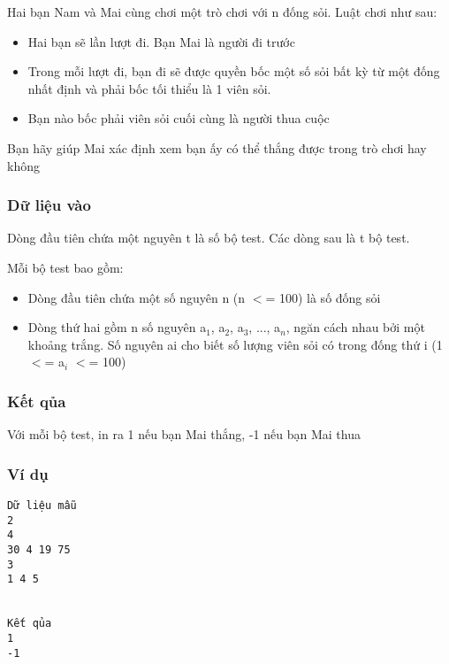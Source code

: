 

Hai bạn Nam và Mai cùng chơi một trò chơi với n đống sỏi. Luật chơi như sau:
\begin{itemize}
	\item Hai bạn sẽ lần lượt đi. Bạn Mai là người đi trước
	\item Trong mỗi lượt đi, bạn đi sẽ được quyền bốc một số sỏi bất kỳ từ một đống nhất định và phải bốc tối thiểu là 1 viên sỏi.
	\item Bạn nào bốc phải viên sỏi cuối cùng là người thua cuộc
\end{itemize}

Bạn hãy giúp Mai xác định xem bạn ấy có thể thắng được trong trò chơi hay không

\subsubsection{Dữ liệu vào}

Dòng đầu tiên chứa một nguyên t là số bộ test. Các dòng sau là t bộ test.

Mỗi bộ test bao gồm:
\begin{itemize}
	\item Dòng đầu tiên chứa một số nguyên n (n $<$= 100) là số đống sỏi
	\item Dòng thứ hai gồm n số nguyên a$_1$, a$_2$, a$_3$, ..., a$_n$, ngăn cách nhau bởi một khoảng trắng. Số nguyên ai cho biết số lượng viên sỏi có trong đống thứ i (1 $<$= a$_i $ $<$= 100)
\end{itemize}

\subsubsection{Kết qủa}

Với mỗi bộ test, in ra 1 nếu bạn Mai thắng, -1 nếu bạn Mai thua

\subsubsection{Ví dụ}
\begin{verbatim}
Dữ liệu mẫu
2
4
30 4 19 75
3
1 4 5


Kết qủa
1
-1
\end{verbatim}
